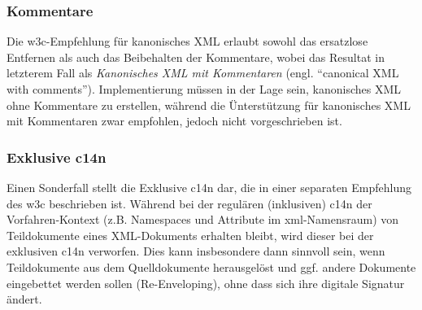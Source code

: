 \subsubsection{Kommentare}

Die \gls{w3c}-Empfehlung für kanonisches XML erlaubt sowohl das ersatzlose Entfernen als auch das Beibehalten der Kommentare, wobei das Resultat in letzterem Fall als \emph{Kanonisches XML mit Kommentaren} (engl. \enquote{canonical XML with comments})\cite[Abschnitt 2.1]{boyer2001c14n}. Implementierung müssen in der Lage sein, kanonisches XML ohne Kommentare zu erstellen, während die Ünterstützung für kanonisches XML mit Kommentaren zwar empfohlen, jedoch nicht vorgeschrieben ist.

\subsubsection{Exklusive \acrlong{c14n}}

Einen Sonderfall stellt die Exklusive \acrlong{c14n} dar, die in einer separaten Empfehlung des \gls{w3c} beschrieben ist.\cite{boyer2002excc14n} Während bei der regulären (inklusiven) \acrlong{c14n} der Vorfahren-Kontext (z.B. Namespaces und Attribute im \acrshort{xml}-Namensraum) von Teildokumente eines XML-Dokuments erhalten bleibt, wird dieser bei der exklusiven \acrshort{c14n} verworfen.\cite[Abschnitt~18]{siddiqui2002c14n2} Dies kann insbesondere dann sinnvoll sein, wenn Teildokumente aus dem Quelldokumente herausgelöst und ggf. andere Dokumente eingebettet werden sollen (Re-Enveloping), ohne dass sich ihre digitale Signatur ändert.
